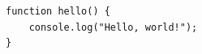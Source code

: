 \documentclass{article}
\begin{document}
\begin{verbatim}
function hello() {
    console.log("Hello, world!");
}
\end{verbatim}
\end{document}
